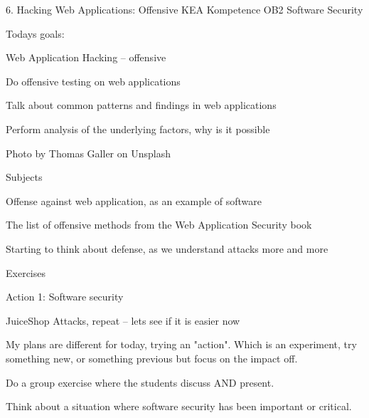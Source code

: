 \documentclass[Screen16to9,17pt]{foils}
\begin{document}
\mytitlepage
{6. Hacking Web Applications: Offensive}
{KEA Kompetence OB2 Software Security}




Todays goals:
\begin{list2}
\item Web Application Hacking -- offensive
\item Do offensive testing on web applications
\item Talk about common patterns and findings in web applications
\item Perform analysis of the underlying factors, why is it possible
\end{list2}

Photo by Thomas Galler on Unsplash




\begin{list1}
\item Subjects
\begin{list2}
\item Offense against web application, as an example of software
\item The list of offensive methods from the Web Application Security book
\item Starting to think about defense, as we understand attacks more and more
\end{list2}
\item Exercises
\begin{list2}
\item Action 1: Software security
\item JuiceShop Attacks, repeat -- lets see if it is easier now
\end{list2}
\end{list1}

My plans are different for today, trying an "action". Which is an experiment,
try something new, or something previous but focus on the impact off.


Do a group exercise where the students discuss AND present.

Think about a situation where software security has been important or critical.
\end{document}
